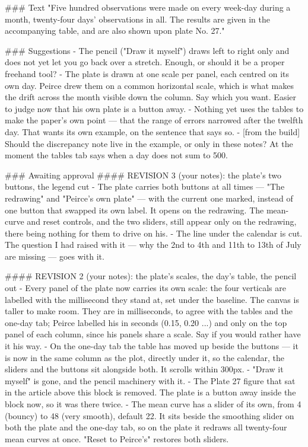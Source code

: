 ### Text
"Five hundred observations were made on every week-day during a month,
twenty-four days' observations in all. The results are given in the accompanying
table, and are also shown upon plate No. 27."

### Suggestions
- The pencil ("Draw it myself") draws left to right only and does not yet let
  you go back over a stretch. Enough, or should it be a proper freehand tool?
- The plate is drawn at one scale per panel, each centred on its own day. Peirce
  drew them on a common horizontal scale, which is what makes the drift across
  the month visible down the column. Say which you want. Easier to judge now
  that his own plate is a button away.
- Nothing yet uses the tables to make the paper's own point — that the range of
  errors narrowed after the twelfth day. That wants its own example, on the
  sentence that says so.
- [from the build] Should the discrepancy note live in the example, or only in
  these notes? At the moment the tables tab says when a day does not sum to 500.

### Awaiting approval
#### REVISION 3 (your notes): the plate's two buttons, the legend cut
- The plate carries both buttons at all times — "The redrawing" and "Peirce's
  own plate" — with the current one marked, instead of one button that swapped
  its own label. It opens on the redrawing. The mean-curve and reset controls,
  and the two sliders, still appear only on the redrawing, there being nothing
  for them to drive on his.
- The line under the calendar is cut. The question I had raised with it — why
  the 2nd to 4th and 11th to 13th of July are missing — goes with it.

#### REVISION 2 (your notes): the plate's scales, the day's table, the pencil out
- Every panel of the plate now carries its own scale: the four verticals are
  labelled with the millisecond they stand at, set under the baseline. The
  canvas is taller to make room. They are in milliseconds, to agree with the
  tables and the one-day tab; Peirce labelled his in seconds (0.15, 0.20 ...)
  and only on the top panel of each column, since his panels share a scale.
  Say if you would rather have it his way.
- On the one-day tab the table has moved up beside the buttons — it is now in
  the same column as the plot, directly under it, so the calendar, the sliders
  and the buttons sit alongside both. It scrolls within 300px.
- "Draw it myself" is gone, and the pencil machinery with it.
- The Plate 27 figure that sat in the article above this block is removed. The
  plate is a button away inside the block now, so it was there twice.
- The mean curve has a slider of its own, from 4 (bouncy) to 48 (very smooth),
  default 22. It sits beside the smoothing slider on both the plate and the
  one-day tab, so on the plate it redraws all twenty-four mean curves at once.
  "Reset to Peirce's" restores both sliders.

